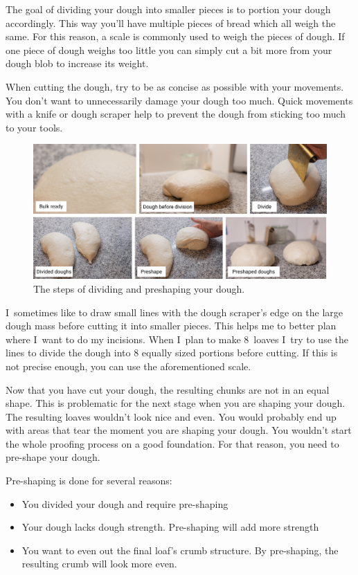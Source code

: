 The goal of dividing your dough into smaller pieces is to portion
your dough accordingly. This way you'll have multiple pieces of bread
which all weigh the same. For this reason, a scale is commonly
used to weigh the pieces of dough. If one piece of dough weighs
too little you can simply cut a bit more from your dough blob
to increase its weight.

When cutting the dough, try to be as concise as possible with your
movements. You don't want to unnecessarily damage your dough too much.
Quick movements with a knife or dough scraper help to prevent the
dough from sticking too much to your tools.

\begin{figure}[!htb]
  \centering
  \includegraphics[width=\textwidth]{divide-preshape}
  \caption{The steps of dividing and preshaping your dough.}
\end{figure}

I~sometimes like to draw small lines with the dough scraper's edge
on the large dough mass before cutting it into smaller pieces.
This helps me to better plan where I~want to do my incisions. When
I~plan to make 8~loaves I~try to use the lines to divide the dough
into 8 equally sized portions before cutting. If this is not precise enough,
you can use the aforementioned scale.

Now that you have cut your dough, the resulting chunks are not in an equal shape.
This is problematic for the next stage when you are shaping your dough.
The resulting loaves wouldn't look nice and even. You would probably
end up with areas that tear the moment you are shaping your dough.
You wouldn't start the whole proofing process on a good foundation. For that
reason, you need to pre-shape your dough.

Pre-shaping is done for several reasons:
\begin{itemize}
  \item You divided your dough and require pre-shaping
  \item Your dough lacks dough strength. Pre-shaping will add more strength
  \item You want to even out the final loaf's crumb structure. By pre-shaping,
  the resulting crumb will look more even.
\end{itemize}

